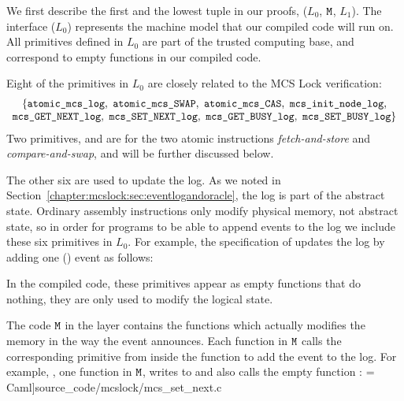 We first describe the first and the lowest tuple in our proofs, ($L_0$, ${\mathrm{\texttt{M}}}$, $L_1$).
The interface ($L_0$) represents the machine model that our compiled code will run on.
All primitives defined in $L_0$ are part of the trusted computing base, and correspond to empty functions in our compiled code.

Eight of the primitives in $L_0$  are closely related to the MCS Lock verification:
$$
\begin{array}{c}
\{\codeinmath{atomic\_mcs\_log},\ \codeinmath{atomic\_mcs\_SWAP},\ \codeinmath{atomic\_mcs\_CAS},\ \codeinmath{mcs\_init\_node\_log},\\
\codeinmath{mcs\_GET\_NEXT\_log},\ \codeinmath{mcs\_SET\_NEXT\_log},\ \codeinmath{mcs\_GET\_BUSY\_log},\ \codeinmath{mcs\_SET\_BUSY\_log}\} \\
\end{array}
$$
Two primitives,  and  are for the two atomic instructions {\em fetch-and-store} and {\em compare-and-swap}, and will be further discussed below.

The other six are used to update the log.  As we noted in
Section~\ref{chapter:mcslock:sec:eventlogandoracle}, the log is part of the abstract
state. Ordinary assembly instructions only modify physical memory, not
abstract state, so in order for programs to be able to append events to
the log we include these six primitives in $L_0$. 
For example, the specification of  updates the log by adding one () event as follows:
 
In the compiled code, these primitives appear as empty functions that do nothing, they are only used to modify the logical state.


The code ${\mathrm{\texttt{M}}}$ in the layer contains the 
functions which actually modifies the memory in the way the event announces.
Each function in ${\mathrm{\texttt{M}}}$ calls the corresponding primitive from
 inside the function to add the event to the log.
For example, , one function in ${\mathrm{\texttt{M}}}$, writes
to  and also calls
the empty function :
 = Caml]{source_code/mcslock/mcs_set_next.c}

